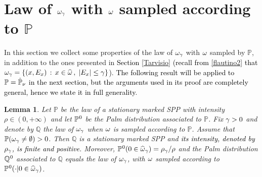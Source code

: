\documentclass[12pt,a4paper,reqno]{amsart}
\newtheorem{Lemma}[Theorem]{Lemma}
\newcommand{\bbP}{{\ensuremath{\mathbb P}} }
\newcommand{\bbQ}{{\ensuremath{\mathbb Q}} }
\newcommand{\rosso}{\textcolor{black}} %
\newcommand{\vvv}{\textcolor{black}} %
\newcommand{\orc}{\textcolor{black}} %
\newcommand{\vpz}{\vvv{\bbP^{\hspace{0.013cm}0} }}
\newcommand{\vqz}{\vvv{\bbQ^{\hspace{0.013cm}0} }}
\begin{document}
  \section{Law of $\omega_\gamma$ with $\omega$ sampled according to $\bbP$}\label{barretta}
In this  section we collect some properties of the law of $\omega_\gamma$  with $\omega$ sampled by $\bbP$, in addition to the ones presented in \orc{Section \ref{Tarvisio}}  \rosso{(recall from \eqref{flautino2} that $\omega_\gamma=\{(x,E_x)\,:\, x\in \widehat{\omega}\,,\; |E_x| \leq \gamma\}$)}. \rosso{The following result will be applied to $\bbP=\orc{\hat\bbP_\nu}$ in the next section, but the arguments used in its proof are completely general, hence we state it in full generality}.
\begin{Lemma}\label{quinoa} Let $\bbP$ 
be the law of a stationary marked SPP with   intensity $\rho\in (0,+\infty)$ and let 
 $\vpz$ be the Palm distribution associated to    $\bbP$.  Fix $\gamma>0$ and 
    denote by $\bbQ$ the law of $\omega_\gamma$ when $\omega$ is sampled according to $\bbP$. 
Assume that   $\bbP( \o_\g \not =\emptyset)>0$.
Then $\bbQ $ is a stationary marked SPP  and \orc{its intensity, denoted by $\rho_\gamma$, is finite and positive}. Moreover, 
$\vpz(0\in \rosso{\widehat\o}_\g)=\rho_\g/\rho $ and 
 the Palm distribution $\vqz$ associated  to  $\bbQ $
equals 
  the law of $\omega_\gamma$,  with $\omega$ sampled according to $\vpz(\cdot | 0\in \rosso{\widehat\o}_\g)$.
\end{Lemma}
\end{document}
